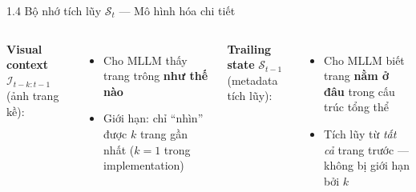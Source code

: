 \documentclass[aspectratio=1610,8pt]{beamer}
\begin{document}
\begin{frame}{1.4 \; Bộ nhớ tích lũy $\mathcal{S}_t$ — Mô hình hóa chi tiết}
    \vspace{0.2em}
    \begin{columns}[T]
        {\small \textbf{Visual context} $\mathcal{I}_{t-k:t-1}$ (ảnh trang kề):
        \begin{itemize}
            \item Cho MLLM thấy trang trông \textbf{như thế nào}
            \item Giới hạn: chỉ ``nhìn'' được $k$ trang gần nhất ($k{=}1$ trong implementation)
        \end{itemize}}

        {\small \textbf{Trailing state} $\mathcal{S}_{t-1}$ (metadata tích lũy):
        \begin{itemize}
            \item Cho MLLM biết trang \textbf{nằm ở đâu} trong cấu trúc tổng thể
            \item Tích lũy từ \textit{tất cả} trang trước — không bị giới hạn bởi $k$
        \end{itemize}}
    \end{columns}
\end{frame}
\end{document}
